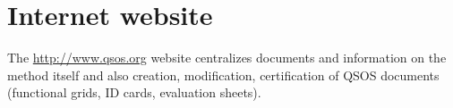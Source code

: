 %
\section{Internet website}
The \url{http://www.qsos.org} website centralizes documents and information on the method itself and also creation, modification, certification of QSOS documents (functional grids, ID cards, evaluation sheets).


